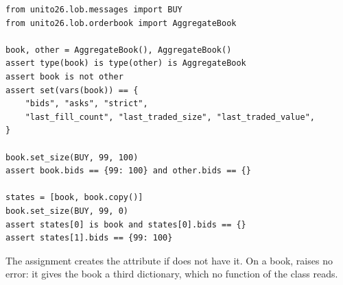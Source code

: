 \begin{lstlisting}[caption={Two instances of one class, and a copy.}, label=listing.twoBooks]
from unito26.lob.messages import BUY
from unito26.lob.orderbook import AggregateBook

book, other = AggregateBook(), AggregateBook()
assert type(book) is type(other) is AggregateBook
assert book is not other
assert set(vars(book)) == {
    "bids", "asks", "strict",
    "last_fill_count", "last_traded_size", "last_traded_value",
}

book.set_size(BUY, 99, 100)
assert book.bids == {99: 100} and other.bids == {}

states = [book, book.copy()]
book.set_size(BUY, 99, 0)
assert states[0] is book and states[0].bids == {}
assert states[1].bids == {99: 100}
\end{lstlisting}

\begin{remark}\label{remark.misspeltAttribute}
 The assignment  creates the attribute if  does not have it.
 On a book,  raises no error:
 it gives the book a third dictionary, which no function of the class reads.
\end{remark}
